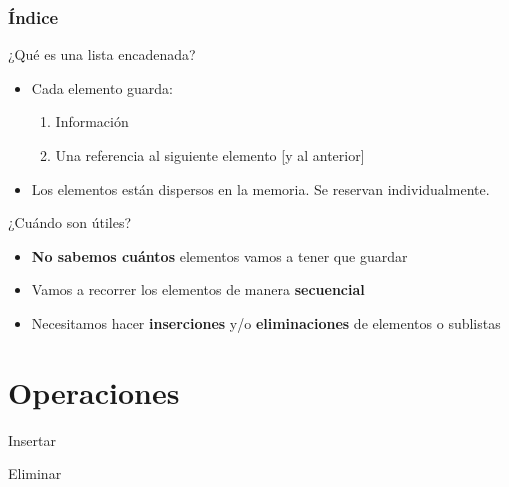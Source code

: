 \documentclass{mybeamer}
\institute{
	{\textsl{\large Tema 9}}
	\\[1em]
	\textbf{\Large Listas encadenadas}
}
\begin{document}
\begin{frame}
\titlepage
\end{frame}

\begin{frame}
\frametitle{Índice}
	\tableofcontents
\end{frame}

\begin{framesec}[¿Qué es?]{¿Qué es una lista encadenada?}
	\vspace{2em}
	\begin{itemize}
		\item Cada elemento guarda:
		\begin{enumerate}
			\item Información
			\item Una referencia al siguiente elemento [y al
				anterior]
		\end{enumerate}
		\item Los elementos están dispersos en la memoria. Se reservan
			individualmente.
	\end{itemize}
\end{framesec}

\begin{framesec}[Utilidad]{¿Cuándo son útiles?}
	\begin{itemize}
		\item \textbf{No sabemos cuántos} elementos vamos a tener que
			guardar
		\item Vamos a recorrer los elementos de manera
			\textbf{secuencial}
		\item Necesitamos hacer \textbf{inserciones} y/o
			\textbf{eliminaciones} de elementos o sublistas
	\end{itemize}
\end{framesec}

\section{Operaciones}
\begin{framesubsec}{Insertar}
	\centering
	\vspace{1em}
\end{framesubsec}

\begin{framesubsec}{Eliminar}
	\centering
	\vspace{1em}
\end{framesubsec}
\end{document}
